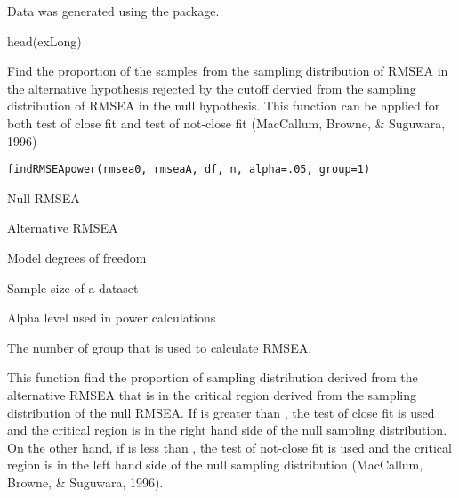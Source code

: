 \documentclass[a4paper]{book}
\begin{document}
%
\begin{Source}\relax
Data was generated using the  package.
\end{Source}
%
\begin{Examples}
\begin{ExampleCode}
head(exLong)
\end{ExampleCode}
\end{Examples}
%
\begin{Description}\relax
Find the proportion of the samples from the sampling distribution of RMSEA in the alternative hypothesis rejected by the cutoff dervied from the sampling distribution of RMSEA in the null hypothesis. This function can be applied for both test of close fit and test of not-close fit (MacCallum, Browne, \& Suguwara, 1996)
\end{Description}
%
\begin{Usage}
\begin{verbatim}
findRMSEApower(rmsea0, rmseaA, df, n, alpha=.05, group=1)
\end{verbatim}
\end{Usage}
%
\begin{Arguments}
\begin{ldescription}
\item[\code{rmsea0}] Null RMSEA
\item[\code{rmseaA}] Alternative RMSEA
\item[\code{df}] Model degrees of freedom
\item[\code{n}] Sample size of a dataset
\item[\code{alpha}] Alpha level used in power calculations
\item[\code{group}] The number of group that is used to calculate RMSEA.

\end{ldescription}
\end{Arguments}
%
\begin{Details}\relax
This function find the proportion of sampling distribution derived from the alternative RMSEA that is in the critical region derived from the sampling distribution of the null RMSEA. If  is greater than , the test of close fit is used and the critical region is in the right hand side of the null sampling distribution. On the other hand, if  is less than , the test of not-close fit is used and the critical region is in the left hand side of the null sampling distribution (MacCallum, Browne, \& Suguwara, 1996). 
\end{Details}
\end{document}
